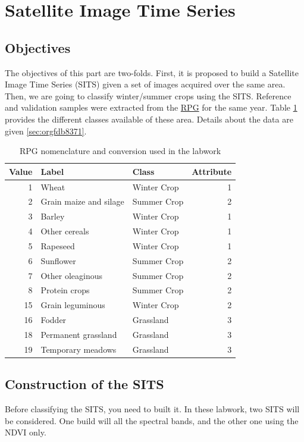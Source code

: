 \documentclass[a4paper,11pt,DIV=18]{scrartcl}
\begin{document}
\section{Satellite Image Time Series}
\label{sec:orgabd1464}
\subsection{Objectives}
\label{sec:orgce8bc99}
The objectives  of this part are  two-folds. First, it is  proposed to
build  a Satellite  Image Time  Series (SITS)  given a  set of  images
acquired  over  the  same  area.   Then,  we  are  going  to  classify
winter/summer crops  using the SITS. Reference  and validation samples
were extracted from the \href{https://www.data.gouv.fr/fr/datasets/registre-parcellaire-graphique-2012-contours-des-ilots-culturaux-et-leur-groupe-de-cultures-majorita/}{RPG} for  the same year. Table \ref{tab:org3fa4dc3} provides
the different classes available of  these area. Details about the data
are given \ref{sec:orgfdb8371}.

\begin{table}[htbp]
\caption{\label{tab:org3fa4dc3}
RPG nomenclature and conversion used in the labwork}
\centering
\begin{tabular}{rllr}
\toprule
Value & Label & Class & Attribute\\
\midrule
1 & Wheat & Winter Crop & 1\\
2 & Grain maize and silage & Summer Crop & 2\\
3 & Barley & Winter Crop & 1\\
4 & Other cereals & Winter Crop & 1\\
5 & Rapeseed & Winter Crop & 1\\
6 & Sunflower & Summer Crop & 2\\
7 & Other oleaginous & Summer Crop & 2\\
8 & Protein crops & Summer Crop & 2\\
15 & Grain leguminous & Winter Crop & 2\\
16 & Fodder & Grassland & 3\\
18 & Permanent grassland & Grassland & 3\\
19 & Temporary meadows & Grassland & 3\\
\bottomrule
\end{tabular}
\end{table}

\subsection{Construction of the SITS}
\label{sec:org1ac87e3}
Before classifying the  SITS, you need to built it.  In these labwork,
two SITS  will be considered. One  build will all the  spectral bands,
and the other one using the NDVI only.
\end{document}
